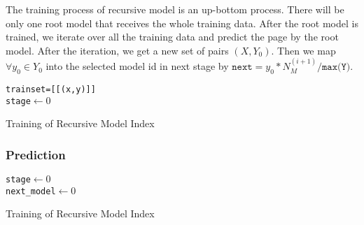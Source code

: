 The training process of recursive model is an up-bottom process. There will be only one root model that receives the whole training data. After the root model is trained, we iterate over all the training data and predict the page by the root model. After the iteration, we get a new set of pairs $(X, Y_0)$. Then we map $\forall y_0\in Y_0$ into the selected model id in next stage by $\texttt{next}=y_0 * N_M^{(i+1)}/\texttt{max(Y)}$.

\begin{algorithm}[H]
    \SetAlgoLined
     \texttt{trainset=[[(x,y)]]} \\
     \texttt{stage$\gets 0$} \\
     \caption{Training of Recursive Model Index}
\end{algorithm}

\subsubsection{Prediction}

\begin{algorithm}[H]
    \SetAlgoLined
     \texttt{stage$\gets 0$} \\
 	 \texttt{next\_model$\gets 0$} \\
     \caption{Training of Recursive Model Index}
\end{algorithm}
